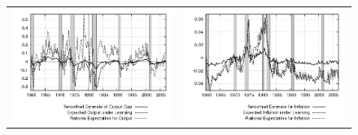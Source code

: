 \documentclass[12pt]{article}
\begin{document}
\begin{figure}[ht]
\begin{center}
\begin{tabular}{cc}
\includegraphics[scale=0.5]{results_cg_wlsinit/output_expre.png} & \includegraphics[scale=0.5]{results_cg_wlsinit/inflation_expre.png} \\
\end{tabular}
\end{center}
\end{figure}



\end{document}
